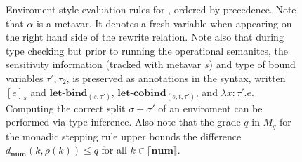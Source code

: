\begin{figure}
\begin{center}
\end{center}
    \caption{Enviroment-style evaluation rules for \Lang, ordered by precedence.
    Note that $\alpha$ is a metavar. It denotes a fresh variable when appearing
    on the right hand side of the rewrite relation.
    Note also that during type checking but prior to running the operational
    semanitcs, the sensitivity information (tracked with metavar $s$) and type
    of bound variables $\tau', \tau_2$, is preserved as annotations in the
    syntax, written $[e]_s$ and $\textbf{let-bind}_{(s, \tau')}$,
    $\textbf{let-cobind}_{(s, t, \tau')}$, and $\lambda x : \tau' . e $.
    Computing the correct split $\sigma + \sigma'$ of an enviroment can be
    performed via type inference.
    Also note that the grade $q$ in $M_q$ for the monadic stepping rule upper
    bounds the difference $d_{\mathbf{num}}(k, \rho(k)) \leq q$ for all $k \in
    \llbracket \mathbf{num} \rrbracket$.
    }
    \label{fig:sub_eval_rules}
\end{figure}
